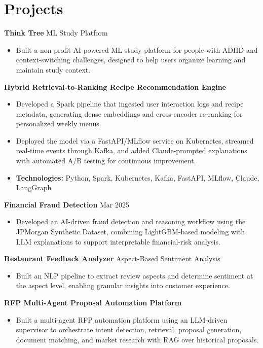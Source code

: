 \documentclass[10pt,a4paper]{article}
\begin{document}
\section{Projects}
\textbf{Think Tree} \textbar{} ML Study Platform\par
\begin{itemize}
  \item Built a non-profit AI-powered ML study platform for people with ADHD and context-switching challenges, designed to help users organize learning and maintain study context.
\end{itemize}
\textbf{Hybrid Retrieval-to-Ranking Recipe Recommendation Engine}\par
\begin{itemize}
  \item Developed a Spark pipeline that ingested user interaction logs and recipe metadata, generating dense embeddings and cross-encoder re-ranking for personalized weekly menus.
  \item Deployed the model via a FastAPI/MLflow service on Kubernetes, streamed real-time events through Kafka, and added Claude-prompted explanations with automated A/B testing for continuous improvement.
  \item \textbf{Technologies:} Python, Spark, Kubernetes, Kafka, FastAPI, MLflow, Claude, LangGraph
\end{itemize}
\textbf{Financial Fraud Detection} \textbar{} Mar 2025\par
\begin{itemize}
  \item Developed an AI-driven fraud detection and reasoning workflow using the JPMorgan Synthetic Dataset, combining LightGBM-based modeling with LLM explanations to support interpretable financial-risk analysis.
\end{itemize}
\textbf{Restaurant Feedback Analyzer} \textbar{} Aspect-Based Sentiment Analysis\par
\begin{itemize}
  \item Built an NLP pipeline to extract review aspects and determine sentiment at the aspect level, enabling granular insights into customer experience.
\end{itemize}
\textbf{RFP Multi-Agent Proposal Automation Platform}\par
\begin{itemize}
  \item Built a multi-agent RFP automation platform using an LLM-driven supervisor to orchestrate intent detection, retrieval, proposal generation, document matching, and market research with RAG over historical proposals.
\end{itemize}
\end{document}
